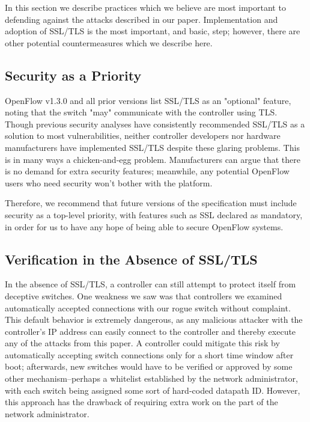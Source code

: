 In this section we describe practices which we believe are most important to defending against the attacks described in our paper. Implementation and adoption of SSL/TLS is the most important, and basic, step; however, there are other potential countermeasures which we describe here.

\subsection{Security as a Priority}

OpenFlow v1.3.0 and all prior versions list SSL/TLS as an "optional" feature, noting that the switch "may" communicate with the controller using TLS. Though previous security analyses have consistently recommended SSL/TLS as a solution to most vulnerabilities, neither controller developers nor hardware manufacturers have implemented SSL/TLS despite these glaring problems. This is in many ways a chicken-and-egg problem. Manufacturers can argue that there is no demand for extra security features; meanwhile, any potential OpenFlow users who need security won't bother with the platform.

Therefore, we recommend that future versions of the specification must include security as a top-level priority, with features such as SSL declared as mandatory, in order for us to have any hope of being able to secure OpenFlow systems. 

\subsection{Verification in the Absence of SSL/TLS}

In the absence of SSL/TLS,  a controller can still attempt to protect itself from deceptive switches. One weakness we saw was that controllers we examined automatically accepted connections with our rogue switch without complaint. This default behavior is extremely dangerous, as any malicious attacker with the controller's IP address can easily connect to the controller and thereby execute any of the attacks from this paper. A controller could mitigate this risk by automatically accepting switch connections only for a short time window after boot; afterwards, new switches would have to be verified or approved by some other mechanism--perhaps a whitelist established by the network administrator, with each switch being assigned some sort of hard-coded datapath ID. However, this approach has the drawback of requiring extra work on the part of the network administrator.

